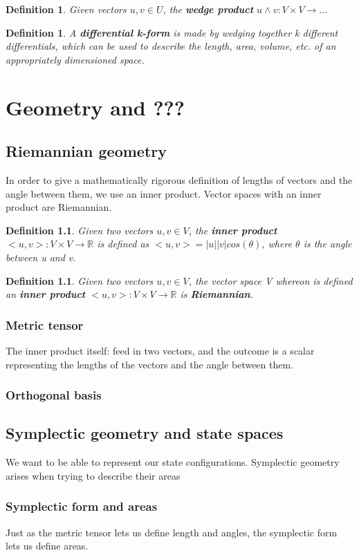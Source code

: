 \documentclass{book}
\newtheorem{defn}[equation]{Definition}
\begin{document}
\begin{defn}
	Given vectors $u, v \in U$, the \textbf{wedge product} $u \wedge v: V \times V \to...$ 
\end{defn}
\begin{defn}
	A \textbf{differential k-form} is made by wedging together k different differentials, which can be used to describe the length, area, volume, etc. of an appropriately dimensioned space. 
\end{defn}


\chapter{Geometry and ???}

\section{Riemannian geometry}
In order to give a mathematically rigorous definition of lengths of vectors and the angle between them, we use an inner product. Vector spaces with an inner product are Riemannian.

\begin{defn}
	Given two vectors $u,v \in V$, the \textbf{inner product} $<u,v> : V \times V \to \mathbb{R}$ is defined as $<u,v> = |u||v|cos(\theta)$, where $\theta$ is the angle between u and v. 
\end{defn}
\begin{defn}
	Given two vectors $u,v \in V$, the vector space V whereon is defined an \textbf{inner product} $<u,v> : V \times V \to \mathbb{R}$ is \textbf{Riemannian}.
	\end{defn}


\subsection{Metric tensor}
The inner product itself: feed in two vectors, and the outcome is a scalar representing the lengths of the vectors and the angle between them. 
\subsection{Orthogonal basis}

\section{Symplectic geometry and state spaces}
We want to be able to represent our state configurations. Symplectic geometry arises when trying to describe their areas

\subsection{Symplectic form and areas}
Just as the metric tensor lets us define length and angles, the symplectic form lets us define areas. 
\end{document}
